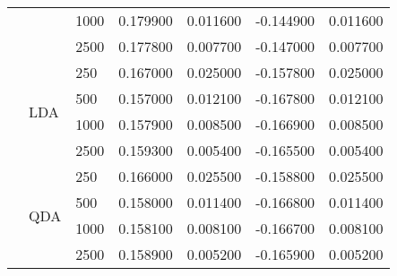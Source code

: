 \begin{tabular}{lllrrrr}
 &  & 1000 & 0.179900 & 0.011600 & -0.144900 & 0.011600 \\
 &  & 2500 & 0.177800 & 0.007700 & -0.147000 & 0.007700 \\
\cline{2-7}
 & \multirow[t]{4}{*}{LDA} & 250 & 0.167000 & 0.025000 & -0.157800 & 0.025000 \\
 &  & 500 & 0.157000 & 0.012100 & -0.167800 & 0.012100 \\
 &  & 1000 & 0.157900 & 0.008500 & -0.166900 & 0.008500 \\
 &  & 2500 & 0.159300 & 0.005400 & -0.165500 & 0.005400 \\
\cline{2-7}
 & \multirow[t]{4}{*}{QDA} & 250 & 0.166000 & 0.025500 & -0.158800 & 0.025500 \\
 &  & 500 & 0.158000 & 0.011400 & -0.166800 & 0.011400 \\
 &  & 1000 & 0.158100 & 0.008100 & -0.166700 & 0.008100 \\
 &  & 2500 & 0.158900 & 0.005200 & -0.165900 & 0.005200 \\
\cline{1-7} \cline{2-7}
\bottomrule
\end{tabular}
